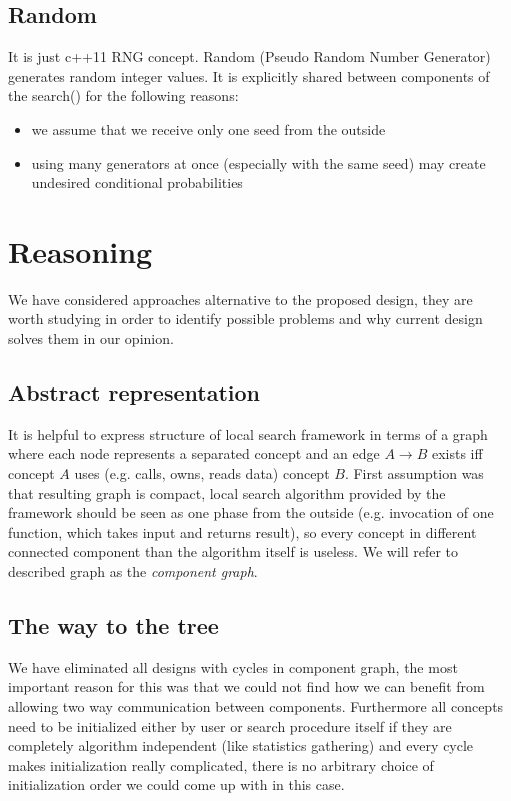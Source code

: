 \subsection{Random}

It is just c++11 RNG concept.
Random (Pseudo Random Number Generator) generates random integer values.
It is explicitly shared between components of the search() for the following reasons:
\begin{itemize}
\item we assume that we receive only one seed from the outside
\item using many generators at once (especially with the same seed) may create undesired conditional probabilities
\end{itemize}

\section{Reasoning}

We have considered approaches alternative to the proposed design, they are
worth studying in order to identify possible problems and why current design
solves them in our opinion.

\subsection{Abstract representation}
It is helpful to express structure of local search framework in terms of a
graph where each node represents a separated concept and an edge $A \to B$
exists iff concept $A$ uses (e.g. calls, owns, reads data) concept $B$. First
assumption was that resulting graph is compact, local search algorithm provided
by the framework should be seen as one phase from the outside (e.g. invocation
of one function, which takes input and returns result), so every concept in
different connected component than the algorithm itself is useless. We will
refer to described graph as the \emph{component graph}.

\subsection{The way to the tree}
We have eliminated all designs with cycles in component graph, the most
important reason for this was that we could not find how we can benefit from
allowing two way communication between components. Furthermore all concepts
need to be initialized either by user or search procedure itself if they are
completely algorithm independent (like statistics gathering) and every cycle
makes initialization really complicated, there is no arbitrary choice of
initialization order we could come up with in this case.

